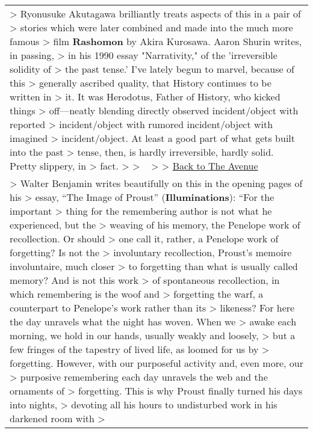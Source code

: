 \begin{longtable}[]{@{}l@{}}
\begin{minipage}[t]{0.97\columnwidth}\raggedright
\textgreater{} Ryonusuke Akutagawa brilliantly treats aspects of this in
a pair of \textgreater{} stories which were later combined and made into
the much more famous \textgreater{} film \textbf{Rashomon} by Akira
Kurosawa. Aaron Shurin writes, in passing, \textgreater{} in his 1990
essay "Narrativity," of the 'irreversible solidity of \textgreater{} the
past tense.' I've lately begun to marvel, because of this \textgreater{}
generally ascribed quality, that History continues to be written in
\textgreater{} it. It was Herodotus, Father of History, who kicked
things \textgreater{} off---neatly blending directly observed
incident/object with reported \textgreater{} incident/object with
rumored incident/object with imagined \textgreater{} incident/object. At
least a good part of what gets built into the past \textgreater{} tense,
then, is hardly irreversible, hardly solid. Pretty slippery, in
\textgreater{} fact. \textgreater{} \textgreater{} ~ \textgreater{}
\textgreater{} \href{hunt.html}{Back to The Avenue}\strut
\end{minipage}\tabularnewline
\begin{minipage}[t]{0.97\columnwidth}\raggedright
\textgreater{} Walter Benjamin writes beautifully on this in the opening
pages of his \textgreater{} essay, ``The Image of Proust''
(\textbf{Illuminations}): ``For the important \textgreater{} thing for
the remembering author is not what he experienced, but the
\textgreater{} weaving of his memory, the Penelope work of recollection.
Or should \textgreater{} one call it, rather, a Penelope work of
forgetting? Is not the \textgreater{} involuntary recollection, Proust's
memoire involuntaire, much closer \textgreater{} to forgetting than what
is usually called memory? And is not this work \textgreater{} of
spontaneous recollection, in which remembering is the woof and
\textgreater{} forgetting the warf, a counterpart to Penelope's work
rather than its \textgreater{} likeness? For here the day unravels what
the night has woven. When we \textgreater{} awake each morning, we hold
in our hands, usually weakly and loosely, \textgreater{} but a few
fringes of the tapestry of lived life, as loomed for us by
\textgreater{} forgetting. However, with our purposeful activity and,
even more, our \textgreater{} purposive remembering each day unravels
the web and the ornaments of \textgreater{} forgetting. This is why
Proust finally turned his days into nights, \textgreater{} devoting all
his hours to undisturbed work in his darkened room with \textgreater{}

\end{minipage}
\end{longtable}
